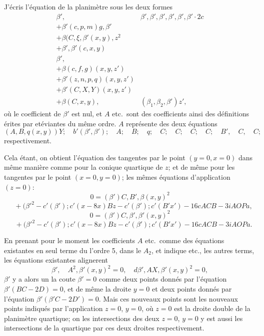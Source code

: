 \documentclass[11pt,a4paper]{article}
\theoremstyle{plain}
\theoremstyle{definition}
\begin{document}
J'\'ecris l'\'equation de la planim\`etre sous les deux formes
\begin{align*}
\beta', \quad & \beta', \beta', \beta', \beta', \beta', \beta' \cdot 2c \\
+ \beta'(c, p, m)g, \beta'  \\
+ \beta(C, \xi, \beta'(x, y), z^2 \\
+ \beta', \beta'(c, x, y) \\
\beta', \\
+ \beta(c, f, g)(x, y, z') \\
+ \beta'(z, n, p, q)(x, y, z') \\
+ \beta'(C, X, Y)(x, y, z') \\
+ \beta(C, x, y), &(\beta_1, \beta_2, \beta')z',
\end{align*}
o\`u le coefficient de $\beta'$ est nul, et $A$ etc.\ sont des coefficients ainsi des d\'efinitions
\'erites par et\'eviantes du m\^eme ordre.  $A$ repr\'esente des deux \'equations
\[
(A, B, q(x, y))Y; \quad b'(\beta', \beta'); \quad A; \quad B; \quad q; \quad C; \quad C; \quad C; \quad C; \quad B', \quad C, \quad C;
\]
respectivement.

Cela \'etant, on obtient l'\'equation des tangentes par le point $(y = 0, x = 0)$ dans m\^eme
mani\`ere comme pour la conique quartique de $z$; et de m\^eme pour les tangentes
par le point $(x = 0, y = 0)$; les m\^emes \'equations d'application $(z = 0)$:
\[
0 = (\beta')C, B', \beta(x, y)^2
\]
\[
\quad + (\beta'^2 - c'(\beta'); c'(x - 8x)Bz - c'(\beta'); c'(B'x') - 16cACB - 3iAOPa,
\]
\[
0 = (\beta')C, \beta', \beta'(x, y)^2
\]
\[
\quad + (\beta'^2 - c'(\beta'); c'(x - 8x)Bz - c'(\beta'); c'(B'x') - 16cACB - 3iAOPa.
\]

En prenant pour le moment les coefficients $A$ etc.\ comme des \'equations existantes en
seul terme du l'ordre 5, dans le $A_2$, et indique etc., les autres terms, les \'equations
existantes alignerent
\[
\beta', \quad A^2, \beta'(x, y)^2 = 0, \quad d\beta', AX, \beta'(x, y)^2 = 0,
\]
$\beta'$ y a alors un la coute $\beta' = 0$ comme deux points donn\'es par l'\'equation $\beta'(BC - 2D) = 0$,
et de m\^eme la droite $y = 0$ et deux points donn\'es par l'\'equation $\beta'(\beta'C - 2D') = 0$.
Mais ces nouveaux points sont les nouveaux points indiqu\'es par l'application $z = 0$, $y = 0$,
o\`u $z = 0$ est la droite double de la planim\`etre quartique; on les intersections des deux
$z = 0$, $y = 0$ y est aussi les intersections de la quartique par ces deux droites respectivement.

\clearpage
\end{document}
